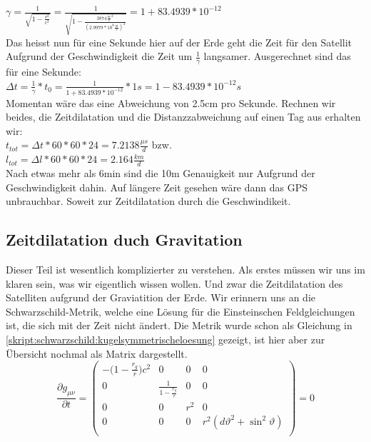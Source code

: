 \begin{refsection}
\(\gamma = \frac{1}{\sqrt{1 - \frac{v^2}{c^2}}} = \frac{1}{\sqrt{1 - \frac{3874 \frac{m}{s}^2}{(2.9979 * 10^8 \frac{m}{s} )^2}}} = 1 + 83.4939 * 10^{-12} \) \\

\noindent{}Das heisst nun für eine Sekunde hier auf der Erde geht die Zeit für den Satellit Aufgrund der Geschwindigkeit die Zeit um \( \frac{1}{\gamma}\) langsamer. Ausgerechnet sind das für eine Sekunde: \\

\( \Delta t = \frac{1}{\gamma} * t_0 = \frac{1}{1 + 83.4939 * 10^{-12}} * 1s = 1 - 83.4939 * 10^{-12}s \) \\

\noindent{}Momentan wäre das eine Abweichung von 2.5cm pro Sekunde. Rechnen wir beides, die Zeitdilatation und die Distanzzabweichung auf einen Tag aus erhalten wir:\\

\( t_{tot} = \Delta t * 60 * 60 * 24 = 7.2138  \frac{\mu s}{d} \) bzw. \\

\( l_{tot} = \Delta l * 60 * 60 * 24 = 2.164 \frac{km}{d} \) \\

\noindent{}Nach etwas mehr als 6min sind die 10m Genauigkeit nur Aufgrund der Geschwindigkeit dahin. Auf längere Zeit gesehen wäre dann das GPS unbrauchbar. Soweit zur Zeitdilatation durch die Geschwindikeit.

\subsection{Zeitdilatation duch Gravitation}
Dieser Teil ist wesentlich komplizierter zu verstehen. Als erstes müssen wir uns im klaren sein, was wir eigentlich wissen wollen. Und zwar die Zeitdilatation des Satelliten aufgrund der Graviatition der Erde. Wir erinnern uns an die Schwarzschild-Metrik, welche eine Lösung für die Einsteinschen Feldgleichungen ist, die sich mit der Zeit nicht ändert. Die Metrik wurde schon als Gleichung in \ref{skript:schwarzschild:kugelsymmetrischeloesung} gezeigt, ist hier aber zur Übersicht nochmal als Matrix dargestellt. \\

\begin{equation}
\frac{\partial g_{\mu\nu}}{\partial t}= 
\begin{pmatrix}
-\biggl(1-\frac{r_g}r\biggr)c^2 & 0 & 0 & 0 \\
0 & \frac1{\displaystyle 1-\frac{r_g}r} & 0 & 0 \\
0 & 0 &  r^2 & 0 \\
0 & 0 & 0 & r^2 (d\vartheta^2 + \sin^2\vartheta) \\
\end{pmatrix}
= 0
\end{equation} \\


\end{refsection}
